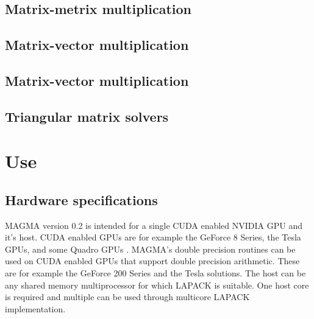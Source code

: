 \documentclass[10pt]{book}
\begin{document}
\newpage
\section{Matrix-metrix multiplication}

\newpage
\section{Matrix-vector multiplication}

\newpage
\section{Matrix-vector multiplication}

\newpage
\section{Triangular matrix solvers}


\normalsize


\chapter{Use}\label{ch:use}

\section{Hardware specifications}\label{hardware}
MAGMA version 0.2 is intended for a single CUDA enabled NVIDIA GPU and 
it's host. CUDA enabled GPUs are for example the GeForce 8 Series, 
the Tesla GPUs, and some Quadro GPUs \cite{GPUManual}. MAGMA's double 
precision routines can be used on CUDA enabled GPUs that support double 
precision arithmetic. 
These are for example the GeForce 200 Series and the Tesla solutions.
The host can be any shared memory multiprocessor for which LAPACK is 
suitable. One host core is required and multiple can be used through
multicore LAPACK implementation.
\end{document}
